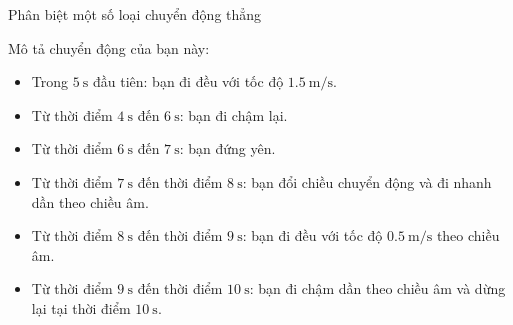 \begin{dang}{Phân biệt một số loại chuyển động thẳng }
{Mô tả chuyển động của bạn này:
\begin{itemize}
	\item Trong $\SI{5}{\second}$ đầu tiên: bạn đi đều với tốc độ $\SI{1.5}{\meter/\second}$.
	\item Từ thời điểm $\SI{4}{\second}$ đến $\SI{6}{\second}$: bạn đi chậm lại.
	\item Từ thời điểm $\SI{6}{\second}$ đến $\SI{7}{\second}$: bạn đứng yên.
	\item Từ thời điểm $\SI{7}{\second}$ đến thời điểm $\SI{8}{\second}$: bạn đổi chiều chuyển động và đi nhanh dần theo chiều âm.
	\item Từ thời điểm $\SI{8}{\second}$ đến thời điểm $\SI{9}{\second}$: bạn đi đều với tốc độ $\SI{0.5}{\meter/\second}$ theo chiều âm.
	\item Từ thời điểm $\SI{9}{\second}$ đến thời điểm $\SI{10}{\second}$: bạn đi chậm dần theo chiều âm và dừng lại tại thời điểm $\SI{10}{\second}$.
\end{itemize}
}
\end{dang}

